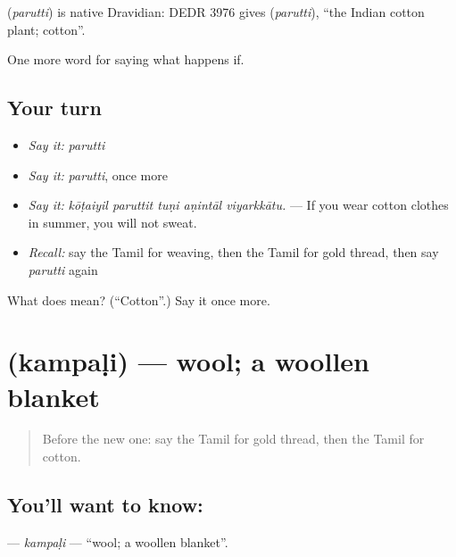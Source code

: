 \begin{cousinweb}
\textbf{} (\emph{parutti}) is native Dravidian: DEDR 3976 gives  (\emph{parutti}), \textquotedblleft{}the Indian cotton plant; cotton\textquotedblright{}.
\end{cousinweb}

\begin{grammarlens}[title={What you've built}]
One more word for saying what happens if.
\end{grammarlens}

\subsection*{Your turn}
\begin{itemize}
\raggedright
  \item \emph{Say it:} \emph{parutti}
  \item \emph{Say it:} \emph{parutti}, once more
  \item \emph{Say it:} \emph{kōṭaiyil paruttit tuṇi aṇintāl viyarkkātu.} — If you wear cotton clothes in summer, you will not sweat.
  \item \emph{Recall:} say the Tamil for weaving, then the Tamil for gold thread, then say \emph{parutti} again
\end{itemize}

\begin{tcolorbox}[breakable,colback=teal!4,colframe=teal!35!black,title={Before you move on}]
What does  mean? (\textquotedblleft{}Cotton\textquotedblright{}.) Say it once more.
\end{tcolorbox}
\section[\texorpdfstring{\ta{கம்பளி} (kampaḷi)}{கம்பளி (kampaḷi)}]{ (kampaḷi) — wool; a woollen blanket}

\label{lesson:TA-C557-kampali}



\begin{quote}
Before the new one: say the Tamil for gold thread, then the Tamil for cotton.
\end{quote}

\subsection*{You'll want to know: }
\textbf{} — \emph{kampaḷi} — \textquotedblleft{}wool; a woollen blanket\textquotedblright{}.

